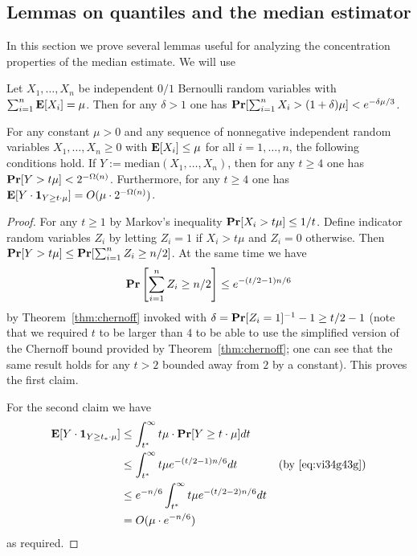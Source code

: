 \subsection{Lemmas on quantiles and the median estimator}
In this section we prove several lemmas   useful for analyzing the concentration properties of the median estimate. We will use 

\begin{theorem}\label{thm:chernoff}
Let $X_1,\ldots, X_n$ be independent $0/1$ Bernoulli random variables with $\sum_{i=1}^n {\bf \mbox{\bf E}}[X_i]=\mu$. Then for any $\delta>1$ one has ${\bf \mbox{\bf Pr}}[\sum_{i=1}^n X_i>(1+\delta)\mu]<e^{-\delta \mu/3}$.
\end{theorem}

\begin{lemma}\label{lm:median}
For any constant $\mu>0$ and any sequence of nonnegative independent random variables  $X_1,\ldots, X_n\geq 0$ with ${\bf \mbox{\bf E}}[X_i] \leq \mu$ for all $i=1,\ldots, n$,  the following conditions hold. If $Y:=\text{median} (X_1,\ldots, X_n)$, then for any $t\geq 4$ one has
${\bf \mbox{\bf Pr}}[Y>t \mu]<2^{-\Omega(n)}$. Furthermore, for any $t\geq 4$ one has 
${\bf \mbox{\bf E}}[Y\cdot \mathbf{1}_{Y\geq t\cdot \mu}]=O(\mu\cdot 2^{-\Omega(n)})$.
\end{lemma}
\begin{proof}
For any $t\geq 1$ by Markov's inequality ${\bf \mbox{\bf Pr}}[X_i>t \mu]\leq 1/t$. Define indicator random variables $Z_i$ by letting $Z_i=1$ if $X_i>t \mu$ and $Z_i=0$ otherwise.
Then ${\bf \mbox{\bf Pr}}[Y>t \mu]\leq {\bf \mbox{\bf Pr}}[\sum_{i=1}^n Z_i\geq n/2]$. At the same time we have 
\begin{equation}\label{eq:vi34g43g}
{\bf \mbox{\bf Pr}}\left[\sum_{i=1}^n Z_i\geq n/2\right]\leq e^{-(t/2-1)n/6}
\end{equation}
by Theorem~\ref{thm:chernoff} invoked with $\delta={\bf \mbox{\bf Pr}}[Z_i=1]^{-1}-1\geq t/2-1$ (note that we required $t$ to be larger than $4$ to be able to use the simplified version of the Chernoff bound provided by Theorem~\ref{thm:chernoff}; one can see that the same result holds for any $t>2$ bounded away from $2$ by a constant). This proves the first claim.

For the second claim we have
\begin{equation*}
\begin{split}
{\bf \mbox{\bf E}}[Y\cdot \mathbf{1}_{Y\geq t_*\cdot \mu}]&\leq \int_{t^*}^\infty t \mu \cdot {\bf \mbox{\bf Pr}}[Y\geq t\cdot \mu]dt\\
&\leq \int_{t^*}^\infty t \mu e^{-(t/2-1)n/6}dt\text{~~~~~~~~~~ (by~\eqref{eq:vi34g43g})}\\
&\leq e^{-n/6}\int_{t^*}^\infty t \mu e^{-(t/2-2)n/6}dt\\
&=O(\mu\cdot e^{-n/6})
\end{split}
\end{equation*}
as required.
\end{proof}
\fi

